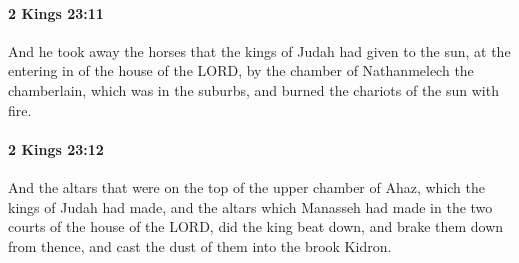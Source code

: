 		\paragraph{2 Kings 23:11} %
			\label{2KINGS-23-11}

			And he took away the horses that the kings of Judah had given to the sun, at the entering in of the house of the LORD, by the chamber of Nathanmelech the chamberlain, which was in the suburbs, and burned the chariots of the sun with fire.


		\paragraph{2 Kings 23:12} %
			\label{2KINGS-23-12}

			And the altars that were on the top of the upper chamber of Ahaz, which the kings of Judah had made, and the altars which Manasseh had made in the two courts of the house of the LORD, did the king beat down, and brake them down from thence, and cast the dust of them into the brook Kidron.

